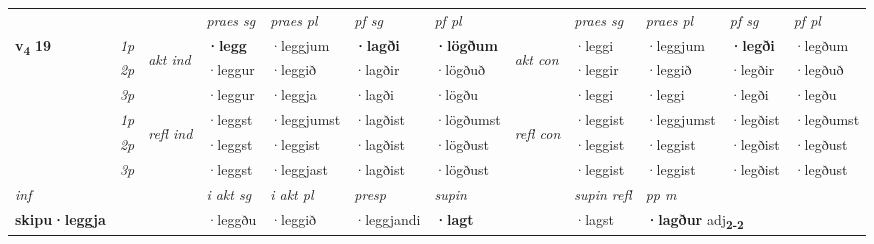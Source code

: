 \begin{longtable}[l]{X>{\footnotesize\itshape}llXXXXlXXXX}
 & &   & \textit{praes sg}  & \textit{praes pl}    & \textit{ pf sg} & \textit{pf pl} & & \textit{praes sg}  & \textit{praes pl}    & \textit{pf sg} & \textit{pf pl }  \\ \cmidrule{4-7} \cmidrule{9-12}
 \multirow{2}{*}{{{\textbf{v{\textsubscript{4}}} \Large{\textbf{19}}}}}  & 1p & \multirow{3}{*}{\begin{turn}{90}\textit{akt ind}\end{turn}} & \textbf{·legg} & ·leggjum & \textbf{·lagði} & \textbf{·lögðum} & \multirow{3}{*}{\begin{turn}{90}\textit{akt con}\end{turn}} &·leggi & ·leggjum & \textbf{·legði} & ·legðum\\*
 & 2p &  &  ·leggur  & ·leggið & ·lagðir & ·lögðuð & & ·leggir & ·leggið & ·legðir & ·legðuð \\*
 & 3p &  & ·leggur & ·leggja & ·lagði & ·lögðu & & ·leggi & ·leggi& ·legði & ·legðu \\*
\cmidrule{4-7} \cmidrule{9-12}
 & 1p & \multirow{3}{*}{\begin{turn}{90}\textit{refl ind}\end{turn}}  & ·leggst & ·leggjumst & ·lagðist & ·lögðumst & \multirow{3}{*}{\begin{turn}{90}\textit{refl con}\end{turn}}  &·leggist & ·leggjumst & ·legðist & ·legðumst \\*
 & 2p &  & ·leggst & ·leggist & ·lagðist & ·lögðust & &·leggist & ·leggist & ·legðist & ·legðust \\*
 & 3p  & & ·leggst & ·leggjast & ·lagðist & ·lögðust & & ·leggist & ·leggist& ·legðist & ·legðust \\*
\cmidrule{4-7} \cmidrule{9-12}

   {\textit{inf}} & &  & \textit{i akt sg} & \textit{i akt pl}   & \textit{presp} & \textit{supin} && \textit{supin refl} & \textit{pp m} \\*
  {\textbf{skipu\allowbreak ·leggja}} & && ·leggðu  & ·leggið   & ·leggjandi &  \textbf{·lagt} && ·lagst & \multicolumn{2}{l}{\textbf{·lagður} adj\textbf{\textsubscript{2-2}}} \\*

\midrule


\end{longtable}
